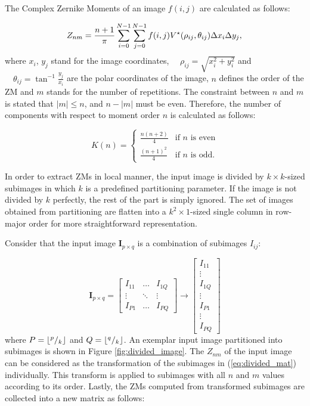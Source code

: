 \documentclass[]{spie}  %
\DeclarePairedDelimiter\floor{\lfloor}{\rfloor}
\begin{document}
The Complex Zernike Moments of an image $f(i,j)$ are calculated as follows:

\begin{equation}
\label{eq:global_zernike}
Z_{nm} = \frac{n+1}{\pi}\sum^{N-1}_{i=0}\sum^{N-1}_{j=0}f(i,j)V^\star(\rho_{ij},\theta_{ij})\Delta
x_i\Delta y_j, \\
\end{equation}
where $x_i$, $y_j$ stand for the image coordinates, $\quad\rho_{ij}=\sqrt{x_i^2+y_i^2}$ and $\quad\theta_{ij} = \tan^{-1}\frac{y_j}{x_i}$ are the polar coordinates of the image, $n$ defines the order of the ZM and $m$ stands for the number of repetitions. The constraint between $n$ and $m$ is stated that $|m|\leq n$, and $n-|m|$ must be even. Therefore, the number of components with respect to moment order $n$ is calculated as follows:

\begin{equation}
K(n) =
\begin{cases}
  \frac{n(n+2)}{4} &\text{if $n$ is even} \\ 
  \frac{(n+1)^2}{4} &\text{if $n$ is odd}.
\end{cases}
\label{eq:num_moms}
\end{equation}

In order to extract ZMs in local manner, the input image is divided by $k\times k$-sized subimages in which $k$ is a predefined partitioning parameter. If the image is not divided by $k$ perfectly, the rest of the part is simply ignored. The set of images obtained from partitioning are flatten into a  $k^2\times 1$-sized single column in row-major order for more straightforward representation.

Consider that the input image $\mathbf{I}_{p\times q}$ is a combination of subimages $I_{ij}$:

\begin{equation}
\mathbf{I}_{p\times q} = \begin{bmatrix}
 I_{11} & \hdots & I_{1Q} \\
 \vdots & \ddots & \vdots \\
 I_{P1} & \hdots & I_{PQ} 
 \end{bmatrix}
 \longrightarrow
 \begin{bmatrix}
 I_{11} \\
 \vdots \\
 I_{1Q} \\
 \vdots \\
 I_{P1} \\
 \vdots \\
 I_{PQ}
 \end{bmatrix}
 \label{eq:divided_mat}
\end{equation}
where $P=\floor*{^p/_k}$ and $Q=\floor*{^q/_k}$. An exemplar input image partitioned into subimages is shown in Figure \ref{fig:divided_image}. The $Z_{nm}$ of the input image can be considered as the transformation of the subimages in (\ref{eq:divided_mat}) individually. This transform is applied to subimages with all $n$ and $m$ values according to its order. Lastly, the ZMs computed from transformed subimages are collected into a new matrix as follows:
\end{document}

